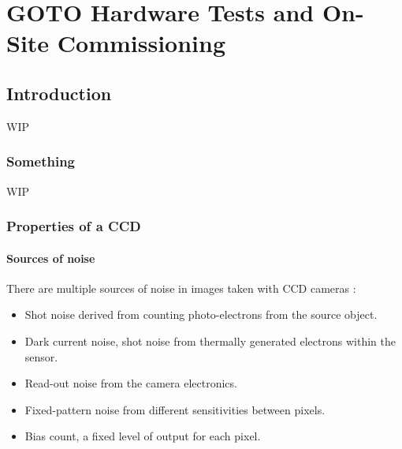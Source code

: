 \chapter{GOTO Hardware Tests and On-Site Commissioning}
\label{chap:commissioning}
\chaptoc{}


\newpage
\section{Introduction}
\label{sec:commissioning_intro}
\begin{colsection}


\begin{colsection}

WIP

\end{colsection}

\subsection{Something}
\label{sec:something}
\begin{colsection}

WIP

\end{colsection}

\newpage
\subsection{Properties of a CCD}
\label{sec:CCDs}
\begin{colsection}

\newpage
\subsubsection{Sources of noise}

There are multiple sources of noise in images taken with CCD cameras \citep{CCDs}:

\begin{itemize}
    \item Shot noise derived from counting photo-electrons from the source object.
    \item Dark current noise, shot noise from thermally generated electrons within the sensor.
    \item Read-out noise from the camera electronics.
    \item Fixed-pattern noise from different sensitivities between pixels.
    \item Bias count, a fixed level of output for each pixel.
\end{itemize}


\end{colsection}
\end{colsection}

